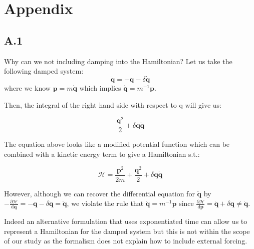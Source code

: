 \documentclass[twoside]{article}
\begin{document}
\section*{Appendix}

\subsection*{A.1}

Why can we not including damping into the Hamiltonian? Let us take the following damped system:
\begin{equation}
\ddot{\mathbf{q}} = -\mathbf{q} - \delta\dot{\mathbf{q}}
\end{equation}
where we know $\mathbf{p}=m\dot{\mathbf{q}}$ which implies $\dot{\mathbf{q}} = m^{-1}\mathbf{p}$.

Then, the integral of the right hand side with respect to q will give us:

\begin{equation}
\frac{\mathbf{q}^2}{2} + \delta \mathbf{q} \dot{\mathbf{q}}
\end{equation}

The equation above looks like a modified potential function which can be combined with a kinetic energy term to give a Hamiltonian s.t.:

\begin{equation}
\mathcal{H} =\frac{ \mathbf{p}^2}{2m} + \frac{\mathbf{q}^2}{2} + \delta \mathbf{q} \dot{\mathbf{q}}
\end{equation}

However, although we can recover the differential equation for $\ddot{\mathbf{q}}$ by $-\frac{\partial\mathcal{H}}{\mathrm{d}\mathbf{q}}  =-\mathbf{q} - \delta\dot{\mathbf{q}} = \ddot{\mathbf{q}}$, we violate the rule that $\dot{\mathbf{q}} = m^{-1}\mathbf{p}$ since $ \frac{\partial\mathcal{H}}{\mathrm{d}\mathbf{p}} =  \dot{\mathbf{q}} +\delta \mathbf{q} \neq \dot{\mathbf{q}} $.

Indeed an alternative formulation that uses exponentiated time can allow us to represent a Hamiltonian for the damped system but this is not within the scope of our study as the formalism does not explain how to include external forcing.
\end{document}
